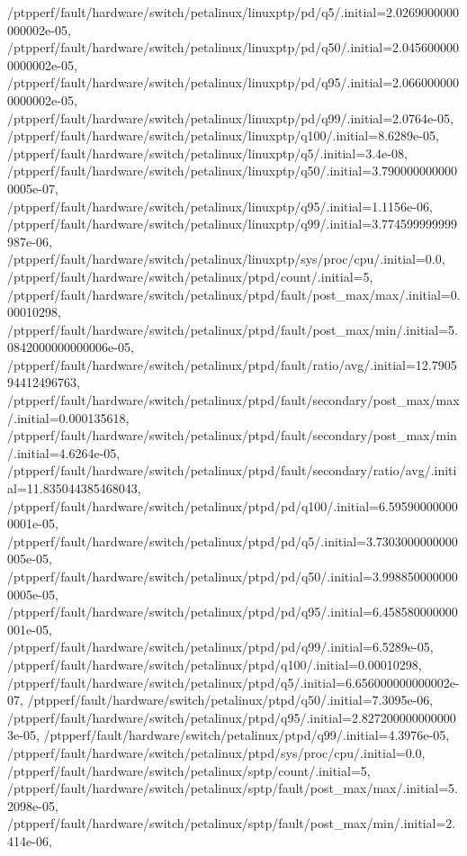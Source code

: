 {    /ptpperf/fault/hardware/switch/petalinux/linuxptp/pd/q5/.initial=2.0269000000000002e-05,
    /ptpperf/fault/hardware/switch/petalinux/linuxptp/pd/q50/.initial=2.0456000000000002e-05,
    /ptpperf/fault/hardware/switch/petalinux/linuxptp/pd/q95/.initial=2.0660000000000002e-05,
    /ptpperf/fault/hardware/switch/petalinux/linuxptp/pd/q99/.initial=2.0764e-05,
    /ptpperf/fault/hardware/switch/petalinux/linuxptp/q100/.initial=8.6289e-05,
    /ptpperf/fault/hardware/switch/petalinux/linuxptp/q5/.initial=3.4e-08,
    /ptpperf/fault/hardware/switch/petalinux/linuxptp/q50/.initial=3.7900000000000005e-07,
    /ptpperf/fault/hardware/switch/petalinux/linuxptp/q95/.initial=1.1156e-06,
    /ptpperf/fault/hardware/switch/petalinux/linuxptp/q99/.initial=3.774599999999987e-06,
    /ptpperf/fault/hardware/switch/petalinux/linuxptp/sys/proc/cpu/.initial=0.0,
    /ptpperf/fault/hardware/switch/petalinux/ptpd/count/.initial=5,
    /ptpperf/fault/hardware/switch/petalinux/ptpd/fault/post_max/max/.initial=0.00010298,
    /ptpperf/fault/hardware/switch/petalinux/ptpd/fault/post_max/min/.initial=5.0842000000000006e-05,
    /ptpperf/fault/hardware/switch/petalinux/ptpd/fault/ratio/avg/.initial=12.790594412496763,
    /ptpperf/fault/hardware/switch/petalinux/ptpd/fault/secondary/post_max/max/.initial=0.000135618,
    /ptpperf/fault/hardware/switch/petalinux/ptpd/fault/secondary/post_max/min/.initial=4.6264e-05,
    /ptpperf/fault/hardware/switch/petalinux/ptpd/fault/secondary/ratio/avg/.initial=11.835044385468043,
    /ptpperf/fault/hardware/switch/petalinux/ptpd/pd/q100/.initial=6.595900000000001e-05,
    /ptpperf/fault/hardware/switch/petalinux/ptpd/pd/q5/.initial=3.7303000000000005e-05,
    /ptpperf/fault/hardware/switch/petalinux/ptpd/pd/q50/.initial=3.9988500000000005e-05,
    /ptpperf/fault/hardware/switch/petalinux/ptpd/pd/q95/.initial=6.458580000000001e-05,
    /ptpperf/fault/hardware/switch/petalinux/ptpd/pd/q99/.initial=6.5289e-05,
    /ptpperf/fault/hardware/switch/petalinux/ptpd/q100/.initial=0.00010298,
    /ptpperf/fault/hardware/switch/petalinux/ptpd/q5/.initial=6.656000000000002e-07,
    /ptpperf/fault/hardware/switch/petalinux/ptpd/q50/.initial=7.3095e-06,
    /ptpperf/fault/hardware/switch/petalinux/ptpd/q95/.initial=2.8272000000000003e-05,
    /ptpperf/fault/hardware/switch/petalinux/ptpd/q99/.initial=4.3976e-05,
    /ptpperf/fault/hardware/switch/petalinux/ptpd/sys/proc/cpu/.initial=0.0,
    /ptpperf/fault/hardware/switch/petalinux/sptp/count/.initial=5,
    /ptpperf/fault/hardware/switch/petalinux/sptp/fault/post_max/max/.initial=5.2098e-05,
    /ptpperf/fault/hardware/switch/petalinux/sptp/fault/post_max/min/.initial=2.414e-06,
}
